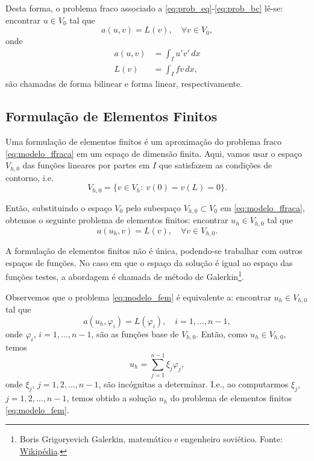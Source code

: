 Desta forma, o problema fraco associado a \eqref{eq:prob_eq}-\eqref{eq:prob_bc} lê-se: encontrar $u\in V_0$ tal que
\begin{equation}\label{eq:modelo_ffraca}
  a(u,v) = L(v),\quad\forall v\in V_0,
\end{equation}
onde
\begin{align}
  a(u,v) &= \int_I u'v'\,dx\label{eq:modelo_fbilinear}\\
  L(v) &= \int_I fv\,dx,\label{eq:modelo_flinear}
\end{align}
são chamadas de forma bilinear e forma linear, respectivamente.

\subsection{Formulação de Elementos Finitos}
\badgeRevisar

Uma formulação de elementos finitos é um aproximação do problema fraco \eqref{eq:modelo_ffraca} em um espaço de dimensão finita. Aqui, vamos usar o espaço $V_{h,0}$ das funções lineares por partes em $I$ que satisfazem as condições de contorno, i.e.
\begin{equation}
  V_{h,0} = \{v\in V_h:~v(0)=v(L)=0\}.
\end{equation}

Então, substituindo o espaço $V_0$ pelo subespaço $V_{h,0}\subset V_0$ em \eqref{eq:modelo_ffraca}, obtemos o seguinte problema de elementos finitos: encontrar $u_h\in V_{h,0}$ tal que
\begin{equation}\label{eq:modelo_fem}
  a(u_h,v) = L(v),\quad\forall v\in V_{h,0}.
\end{equation}

\begin{obs}
  A formulação de elementos finitos não é única, podendo-se trabalhar com outros espaços de funções. No caso em que o espaço da solução é igual ao espaço das funções testes, a abordagem é chamada de método de Galerkin\footnote{Boris Grigoryevich Galerkin, matemático e engenheiro soviético. Fonte: \href{https://pt.wikipedia.org/wiki/Boris_Galerkin}{Wikipédia}.}.
\end{obs}

Observemos que o problema \eqref{eq:modelo_fem} é equivalente a: encontrar $u_h\in V_{h,0}$ tal que
\begin{equation}
  a(u_h,\varphi_i) = L(\varphi_i),\quad i=1, \dotsc, n-1,
\end{equation}
onde $\varphi_i$, $i=1,\dotsc,n-1$, são as funções base de $V_{h,0}$. Então, como $u_h\in V_{h,0}$, temos
\begin{equation}
  u_h = \sum_{j=1}^{n-1}\xi_j\varphi_j,
\end{equation}
onde $\xi_j$, $j=1,2,\dotsc,n-1$, são incógnitas a determinar. I.e., ao computarmos $\xi_j$, $j=1,2,\dotsc,n-1$, temos obtido a solução $u_h$ do problema de elementos finitos \ref{eq:modelo_fem}.

